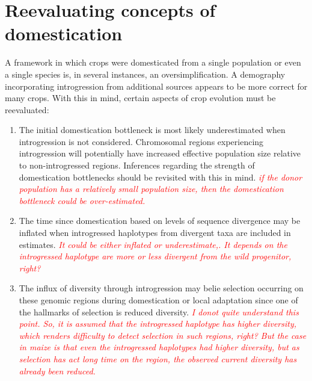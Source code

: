 \documentclass[11pt]{article}
\newcommand{\lwang}[1]{\textcolor{red}{ \emph{\scriptsize  #1}} } %
\begin{document}


\section*{Reevaluating concepts of domestication}
A framework in which crops were domesticated from a single population or even a single species is, in several instances, an oversimplification. A demography incorporating introgression from additional sources appears to be more correct for many crops. With this in mind, certain aspects of crop evolution must be reevaluated:
\begin{enumerate}
	\item{The initial domestication bottleneck is most likely underestimated when introgression is not considered. Chromosomal regions experiencing introgression will potentially have increased effective population size relative to non-introgressed regions. Inferences regarding the strength of domestication bottlenecks should be revisited with this in mind.}\lwang{if the donor population has a relatively small population size, then the domestication bottleneck could be over-estimated.}	
	\item{The time since domestication based on levels of sequence divergence may be inflated when introgressed haplotypes from divergent taxa are included in estimates.}\lwang{It could be either inflated or underestimate,. It depends on the introgressed haplotype are more or less divergent from the wild progenitor, right?}
	\item{The influx of diversity through introgression may belie selection occurring on these genomic regions during domestication or local adaptation since one of the hallmarks of selection is reduced diversity.} \lwang{I donot quite understand this point. So, it is assumed that the introgressed haplotype has higher diversity, which renders difficulty to detect selection in such regions, right? But the case in maize is that even the introgressed haplotypes had higher diversity, but as selection has act long time on the region, the observed current diversity has already been reduced.}
\end{enumerate}
\end{document}
